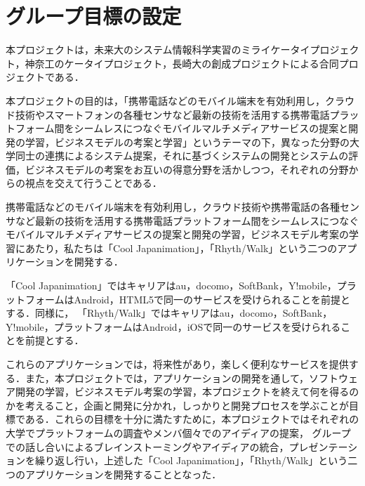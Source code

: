 \section{グループ目標の設定}
本プロジェクトは，未来大のシステム情報科学実習のミライケータイプロジェクト，神奈工のケータイプロジェクト，長崎大の創成プロジェクトによる合同プロジェクトである．
\par
本プロジェクトの目的は，「携帯電話などのモバイル端末を有効利用し，クラウド技術やスマートフォンの各種センサなど最新の技術を活用する携帯電話プラットフォーム間をシームレスにつなぐモバイルマルチメディアサービスの提案と開発の学習，ビジネスモデルの考案と学習」というテーマの下，異なった分野の大学同士の連携によるシステム提案，それに基づくシステムの開発とシステムの評価，ビジネスモデルの考案をお互いの得意分野を活かしつつ，それぞれの分野からの視点を交えて行うことである．
\par
携帯電話などのモバイル端末を有効利用し，クラウド技術や携帯電話の各種センサなど最新の技術を活用する携帯電話プラットフォーム間をシームレスにつなぐモバイルマルチメディアサービスの提案と開発の学習，ビジネスモデル考案の学習にあたり，私たちは「Cool Japanimation」，「Rhyth/Walk」という二つのアプリケーションを開発する．
\par
「Cool Japanimation」ではキャリアはau，docomo，SoftBank，Y!mobile，プラットフォームはAndroid，HTML5で同一のサービスを受けられることを前提とする．同様に，
「Rhyth/Walk」ではキャリアはau，docomo，SoftBank，Y!mobile，プラットフォームはAndroid，iOSで同一のサービスを受けられることを前提とする．
\par
これらのアプリケーションでは，将来性があり，楽しく便利なサービスを提供する．また，本プロジェクトでは，アプリケーションの開発を通して，ソフトウェア開発の学習，ビジネスモデル考案の学習，本プロジェクトを終えて何を得るのかを考えること，企画と開発に分かれ，しっかりと開発プロセスを学ぶことが目標である．これらの目標を十分に満たすために，本プロジェクトではそれぞれの大学でプラットフォームの調査やメンバ個々でのアイディアの提案， グループでの話し合いによるブレインストーミングやアイディアの統合，プレゼンテーションを繰り返し行い，上述した「Cool Japanimation」，「Rhyth/Walk」という二つのアプリケーションを開発することとなった．

